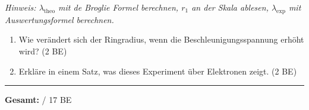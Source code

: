 \documentclass[11pt,a4paper]{article}
\begin{document}
\vspace{0.3em}
{\small\textit{Hinweis: $\lambda_{\text{theo}}$ mit de Broglie Formel berechnen, $r_1$ an der Skala ablesen, $\lambda_{\text{exp}}$ mit Auswertungsformel berechnen.}}

\vspace{0.8em}

\begin{enumerate}[label=\alph*)]
\item Wie verändert sich der Ringradius, wenn die Beschleunigungsspannung erhöht wird? \hfill (2 BE)

\vspace{1.2cm}

\item Erkläre in einem Satz, was dieses Experiment über Elektronen zeigt. \hfill (2 BE)

\vspace{1.2cm}

\end{enumerate}

\vspace{1em}

\begin{center}
\rule{10cm}{0.5pt}

\textbf{Gesamt:} \underline{\hspace{1cm}} / 17 BE
\end{center}
\end{document}
